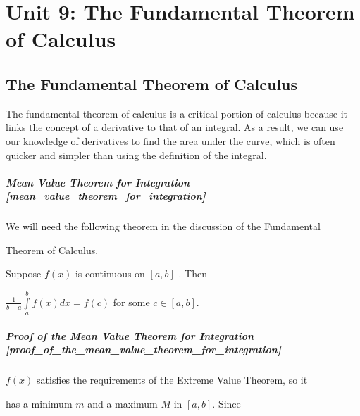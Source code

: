 \chapter{Unit 9: The Fundamental Theorem of Calculus}
\label{chap:unit9}

\section{The Fundamental Theorem of Calculus}
\label{sec:the-fundamental-theorem-of-calculus}

The fundamental theorem of calculus is a critical portion of calculus because it links the concept of a derivative to that of an integral. As a result, we can use our knowledge of derivatives to find the area under the curve, which is often quicker and simpler than using the definition of the integral.



\paragraph{Mean Value Theorem for Integration [mean\_value\_theorem\_for\_integration]}



We will need the following theorem in the discussion of the Fundamental

Theorem of Calculus.



Suppose $f(x)$ is continuous on $[a,b]$ . Then

$\frac{1}{b-a}\int\limits_a^b f(x)dx=f(c)$ for some $c\in[a,b]$.



\paragraph{Proof of the Mean Value Theorem for Integration [proof\_of\_the\_mean\_value\_theorem\_for\_integration]}



$f(x)$ satisfies the requirements of the Extreme Value Theorem, so it

has a minimum $m$ and a maximum $M$ in $[a,b]$. Since



